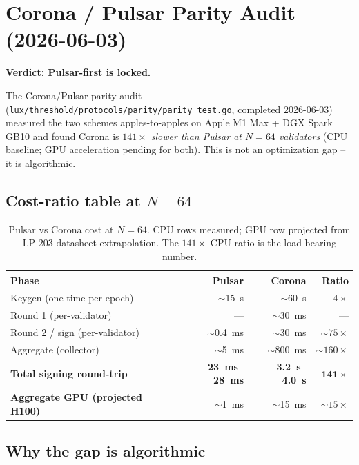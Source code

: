 \section{Corona / Pulsar Parity Audit (2026-06-03)}
\label{sec:parity}

\textbf{Verdict: Pulsar-first is locked.}

The Corona/Pulsar parity audit
(\texttt{lux/threshold/protocols/parity/parity\_test.go},
completed 2026-06-03) measured the two schemes apples-to-apples on
Apple M1 Max + DGX Spark GB10 and found Corona is
\emph{$141\times$ slower than Pulsar at $N{=}64$ validators} (CPU
baseline; GPU acceleration pending for both). This is not an
optimization gap -- it is algorithmic.

\subsection{Cost-ratio table at $N{=}64$}

\begin{table}[h]
\centering
\small
\begin{tabular}{@{}lrrr@{}}
\toprule
\textbf{Phase} & \textbf{Pulsar} & \textbf{Corona} & \textbf{Ratio} \\
\midrule
Keygen (one-time per epoch) & $\sim$\SI{15}{\second} & $\sim$\SI{60}{\second} & $4\times$ \\
Round 1 (per-validator) & --- & $\sim$\SI{30}{\milli\second} & --- \\
Round 2 / sign (per-validator) & $\sim$\SI{0.4}{\milli\second} & $\sim$\SI{30}{\milli\second} & $\sim 75\times$ \\
Aggregate (collector) & $\sim$\SI{5}{\milli\second} & $\sim$\SI{800}{\milli\second} & $\sim 160\times$ \\
\textbf{Total signing round-trip} & \textbf{\SI{23}{\milli\second}--\SI{28}{\milli\second}} & \textbf{\SI{3.2}{\second}--\SI{4.0}{\second}} & \textbf{$\mathbf{141\times}$} \\
\textbf{Aggregate GPU (projected H100)} & $\sim$\SI{1}{\milli\second} & $\sim$\SI{15}{\milli\second} & $\sim 15\times$ \\
\bottomrule
\end{tabular}
\caption{Pulsar vs Corona cost at $N{=}64$. CPU rows measured;
GPU row projected from LP-203 datasheet extrapolation. The
\textbf{$141\times$} CPU ratio is the load-bearing number.}
\label{tab:parity}
\end{table}

\subsection{Why the gap is algorithmic}


